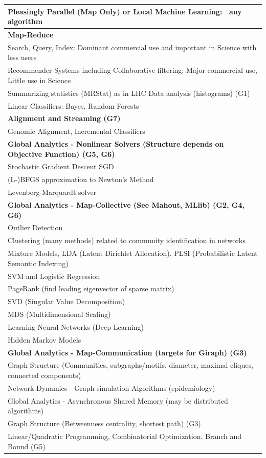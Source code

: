 \documentclass{acm_proc_article-sp}
\begin{document}
\begin{table}
\begin{tabular}{|p{12cm}|}
\textbf{Pleasingly Parallel (Map Only) or Local Machine Learning: ~any algorithm} \\ \hline 
\textbf{Map-Reduce} \\ \hline
Search, Query, Index: Dominant commercial use and important in Science with less users \\ \hline
Recommender Systems including Collaborative filtering: Major commercial use, Little use in Science \\ \hline
Summarizing statistics (MRStat) as in LHC Data analysis (histograms) (G1) \\ \hline
Linear Classifiers: Bayes, Random Forests \\ \hline
\textbf{Alignment and Streaming (G7)} \\ \hline
Genomic Alignment, Incremental Classifiers \\ \hline
\textbf{Global Analytics - Nonlinear Solvers (Structure depends on Objective Function) (G5, G6)} \\ \hline
Stochastic Gradient Descent SGD \\ \hline
(L-)BFGS approximation to Newton's Method \\ \hline
Levenberg-Marquardt solver \\ \hline
\textbf{Global Analytics - Map-Collective (See Mahout, MLlib) (G2, G4, G6)} \\ \hline
Outlier Detection \\ \hline
Clustering (many methods) related to community identification in networks \\ \hline
Mixture Models, LDA (Latent Dirichlet Allocation), PLSI (Probabilistic Latent Semantic Indexing)\\ \hline
SVM and Logistic Regression\\ \hline
PageRank (find leading eigenvector of sparse matrix)\\ \hline
SVD (Singular Value Decomposition)\\ \hline
MDS (Multidimensional Scaling)\\ \hline
Learning Neural Networks (Deep Learning)\\ \hline
Hidden Markov Models\\ \hline
\textbf{Global Analytics - Map-Communication (targets for Giraph) (G3)}\\ \hline
Graph Structure (Communities, subgraphs/motifs, diameter, maximal cliques, connected components)\\ \hline
Network Dynamics - Graph simulation Algorithms (epidemiology)\\ \hline
Global Analytics - Asynchronous Shared Memory (may be distributed algorithms)\\ \hline
Graph Structure (Betweenness centrality, shortest path) (G3)\\ \hline
Linear/Quadratic Programming, Combinatorial Optimization, Branch and Bound (G5)
\\ \hline
\end{tabular}
\end{table}
\end{document}
